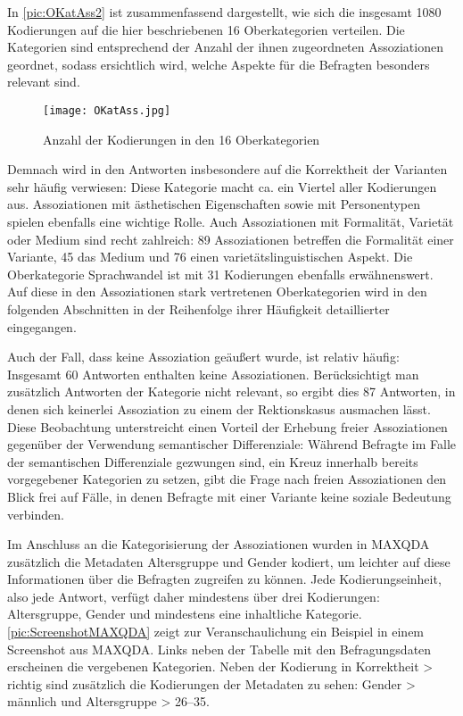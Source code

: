 In \autoref{pic:OKatAss2} ist zusammenfassend dargestellt, wie sich die insgesamt 1080 Kodierungen auf die hier beschriebenen 16 Oberkategorien verteilen. 
Die Kategorien sind entsprechend der Anzahl der ihnen zugeordneten Assoziationen geordnet, sodass ersichtlich wird, welche Aspekte für die Befragten besonders relevant sind.
\begin{figure}
\texttt{[image: OKatAss.jpg]}
\caption{Anzahl der Kodierungen in den 16 Oberkategorien}
\label{pic:OKatAss2}
\end{figure}
Demnach wird in den Antworten insbesondere auf die Korrektheit der Varianten sehr häufig verwiesen: Diese Kategorie macht ca. ein Viertel aller Kodierungen aus. 
Assoziationen mit ästhetischen Eigenschaften sowie mit Personentypen spielen ebenfalls eine wichtige Rolle. 
Auch Assoziationen mit Formalität, Varietät oder Medium sind recht zahlreich: 
89 Assoziationen betreffen die Formalität einer Variante, 45 das Medium und 76 einen varietätslinguistischen Aspekt. 
Die Oberkategorie \glqq Sprachwandel\grqq{} ist mit 31 Kodierungen ebenfalls erwähnenswert. 
Auf diese in den Assoziationen stark vertretenen Oberkategorien wird in den folgenden Abschnitten %
in der Reihenfolge ihrer Häufigkeit %
detaillierter eingegangen. 

Auch der Fall, dass keine Assoziation geäußert wurde, ist relativ häufig:
Insgesamt 60 Antworten enthalten keine Assoziationen. 
Berücksichtigt man zusätzlich Antworten der Kategorie \glqq nicht relevant\grqq{}, so ergibt dies 87 Antworten, in denen sich keinerlei Assoziation zu einem der Rektionskasus ausmachen lässt. 
Diese Beobachtung unterstreicht einen Vorteil der Erhebung freier Assoziationen gegenüber der Verwendung semantischer Differenziale: 
Während Befragte im Falle der semantischen Differenziale gezwungen sind, ein Kreuz innerhalb bereits vorgegebener Kategorien zu setzen, gibt die Frage nach freien Assoziationen den Blick frei auf Fälle, in denen Befragte mit einer Variante keine soziale Bedeutung verbinden.  

Im Anschluss an die Kategorisierung der Assoziationen wurden in MAXQDA zusätzlich die Metadaten Altersgruppe und Gender kodiert, um leichter auf diese Informationen über die Befragten zugreifen zu können. 
Jede Kodierungseinheit, also jede Antwort, verfügt daher mindestens über drei Kodierungen: Altersgruppe, Gender und mindestens eine inhaltliche Kategorie. 
\autoref{pic:ScreenshotMAXQDA} zeigt zur Veranschaulichung ein Beispiel in einem Screenshot aus MAXQDA. 
Links neben der Tabelle mit den Befragungsdaten erscheinen die vergebenen Kategorien. 
Neben der Kodierung in \glqq Korrektheit > richtig\grqq{} sind zusätzlich die Kodierungen der Metadaten zu sehen: \glqq Gender > männlich\grqq{} und \glqq Altersgruppe > 26--35\grqq.

